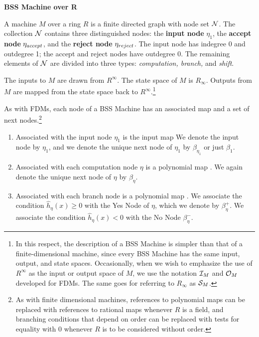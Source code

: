   \begin{definition}{\textbf{BSS Machine over R}}

    A machine $M$ over a ring $R$ is a finite directed graph with
    node set $\mathcal{N}$.  The collection $\mathcal{N}$ contains three
    distinguished nodes: the \textbf{input node} $\eta_1$, the
    \textbf{accept node} $\eta_{accept}$, and the \textbf{reject node}
    $\eta_{reject}$.  The input node has indegree 0 and outdegree 1; the
    accept and reject nodes have outdegree 0.  The remaining
    elements of $\mathcal{N}$ are divided into three types:
    \emph{computation, branch,} and \emph{shift}.

    The inputs to $M$ are drawn from $R^\infty$.  The state space of
    $M$ is $R_\infty$.  Outputs from $M$ are mapped from the state
    space back to $R^\infty$.\footnote{In this respect, the
      description of a BSS Machine is simpler than that of a
      finite-dimensional machine, since every BSS Machine has the same
      input, output, and state spaces.  Occasionally, when we wish to
      emphasize the use of $R^\infty$ as the input or output space of
      $M$, we use the notation $\mathcal{I}_M$ and $\mathcal{O}_M$
      developed for FDMs.  The same goes for referring to $R_\infty$
      as $\mathcal{S}_M$.}

    As with FDMs, each node of a BSS Machine has an associated map and
    a set of next nodes.\footnote{As with finite dimensional machines,
      references to polynomial maps can be replaced with references to
      rational maps whenever $R$ is a field, and branching conditions
      that depend on order can be replaced with tests for equality
      with $0$ whenever $R$ is to be considered without order.}

    \begin{enumerate}
    \item Associated with the input node $\eta_1$ is the input map
       We denote the input node
      by $\eta_1$, and we denote the unique next node of $\eta_1$ by
      $\beta_{\eta_1}$ or just $\beta_1$.

    \item Associated with each computation node $\eta$ is a polynomial
      map . We again
      denote the unique next node of $\eta$ by $\beta_\eta$.

    \item Associated with each branch node is a polynomial map
      .  We associate the
      condition $\widehat{h}_\eta(x) \geq 0$ with the Yes Node of
      $\eta$, which we denote by $\beta_\eta^+$.  We associate the
      condition $\widehat{h}_\eta(x) < 0$ with the No Node
      $\beta_\eta^-$.


\end{enumerate}
\end{definition}
